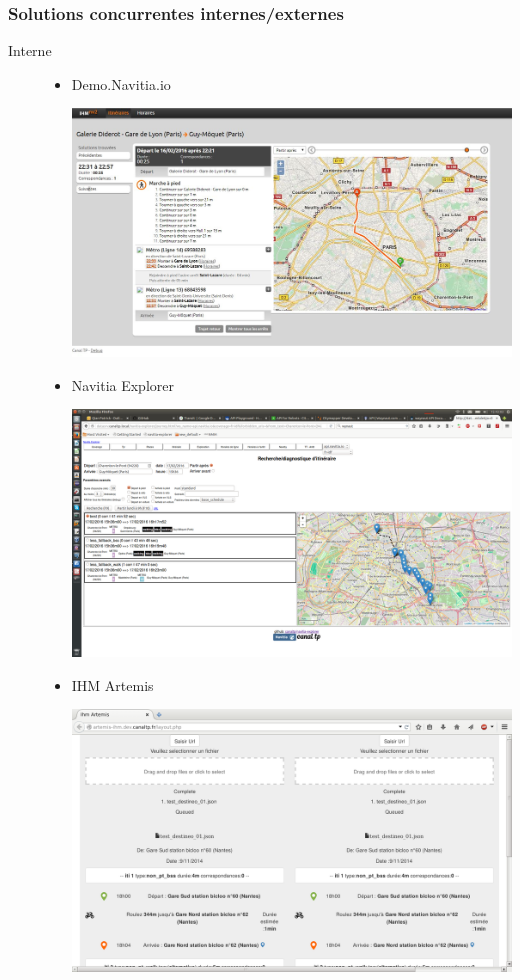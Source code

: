 \documentclass[table]{beamer}
\begin{document}
\begin{frame}
  \frametitle{Solutions concurrentes internes/externes}
  \begin{description}
    \item[Interne]
      \begin{itemize} 
        \item Demo.Navitia.io
           \begin{center}
              \includegraphics[height=0.22\textheight]{images/demo_navitia_io}
           \end{center}
        \item Navitia Explorer
           \begin{center}
             \includegraphics[height=0.22\textheight]{images/navitia-explorer}
           \end{center}
        \item IHM Artemis
          \begin{center}
            \includegraphics[height=0.24\textheight]{images/ihm-artemis}

\end{center}
\end{itemize}
\end{description}
\end{frame}
\end{document}
